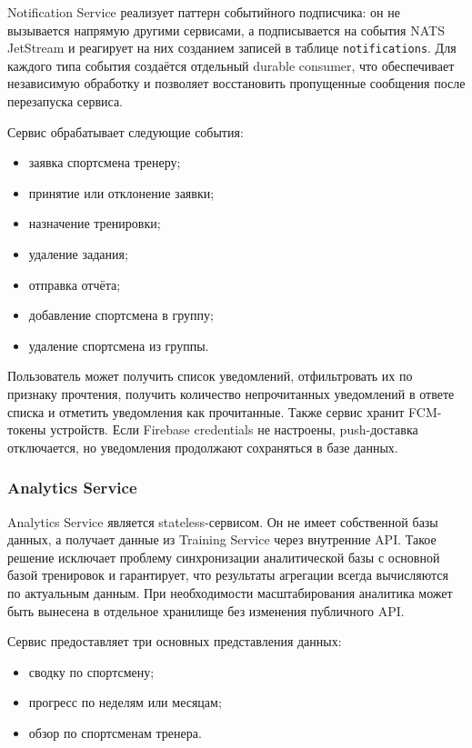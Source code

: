 Notification Service реализует паттерн событийного подписчика: он не вызывается напрямую другими сервисами, а подписывается на события NATS JetStream и реагирует на них созданием записей в таблице \passthrough{\lstinline!notifications!}. Для каждого типа события создаётся отдельный durable consumer, что обеспечивает независимую обработку и позволяет восстановить пропущенные сообщения после перезапуска сервиса.

Сервис обрабатывает следующие события:

\begin{itemize}
\tightlist
\item
  заявка спортсмена тренеру;
\item
  принятие или отклонение заявки;
\item
  назначение тренировки;
\item
  удаление задания;
\item
  отправка отчёта;
\item
  добавление спортсмена в группу;
\item
  удаление спортсмена из группы.
\end{itemize}

Пользователь может получить список уведомлений, отфильтровать их по признаку прочтения, получить количество непрочитанных уведомлений в ответе списка и отметить уведомления как прочитанные. Также сервис хранит FCM-токены устройств. Если Firebase credentials не настроены, push-доставка отключается, но уведомления продолжают сохраняться в базе данных.

\subsubsection{Analytics Service}

Analytics Service является stateless-сервисом. Он не имеет собственной базы данных, а получает данные из Training Service через внутренние API. Такое решение исключает проблему синхронизации аналитической базы с основной базой тренировок и гарантирует, что результаты агрегации всегда вычисляются по актуальным данным. При необходимости масштабирования аналитика может быть вынесена в отдельное хранилище без изменения публичного API.

Сервис предоставляет три основных представления данных:

\begin{itemize}
\tightlist
\item
  сводку по спортсмену;
\item
  прогресс по неделям или месяцам;
\item
  обзор по спортсменам тренера.
\end{itemize}

